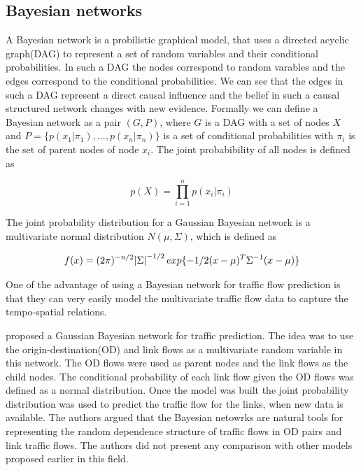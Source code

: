 \subsection{Bayesian networks}
A Bayesian network is a probilistic graphical model, that uses a directed acyclic graph(DAG) to
represent a set of random variables and their conditional probabilities. In such a DAG the nodes
correspond to random varables and the edges correspond to the conditional probabilities. We can see
that the edges in such a DAG represent a direct causal influence and the belief in such a causal
structured network changes with new evidence. Formally we can define a Bayesian network as a
pair $(G,P)$, where $G$ is a DAG with a set of nodes $X$ and $P = \{p(x_{1}|\pi_{1}),..., p(x_{n}|\pi_{n})\}$
is a set of conditional probabilities with $\pi_{i}$ is the set of parent nodes of node $x_{i}$.
The joint probabibility of all nodes is defined as

     \begin{equation} p(X) =  \prod_{i = 1}^n p(x_{i}|\pi_{i}) \end{equation}

The joint probability distribution for a Gaussian Bayesian network is a multivariate
normal distribution $N(\mu, \Sigma)$, which is defined as

     \begin{equation}
      f(x) =  (2\pi)^{-n/2} \abs{\Sigma}^{-1/2} exp\{-1/2(x-\mu)^T \Sigma^{-1}(x-\mu)\}
     \end{equation}

One of the advantage of using a Bayesian network for traffic flow prediction is that they can
very easily model the multivariate traffic flow data to capture the tempo-spatial relations.

\citet{castillo2008predicting} proposed a Gaussian Bayesian network for traffic prediction. The idea
was to use the origin-destination(OD) and link flows as a multivariate random variable in this network.
The OD flows were used as parent nodes and the link flows as the child nodes. The conditional
probability of each link flow given the OD flows was defined as a normal distribution. Once the model
was built the joint probability distribution was used to predict the traffic flow for the links, when
new data is available. The authors argued that the Bayesian netowrks are natural tools for representing
the random dependence structure of traffic flows in OD pairs and link traffic flows. The authors did not
present any comparison with other models proposed earlier in this field.


